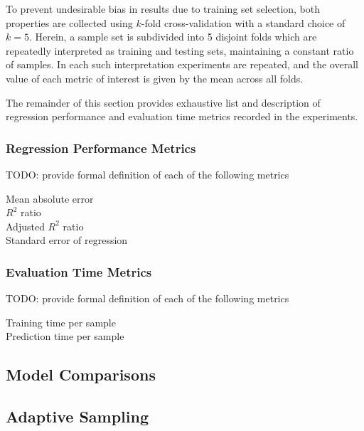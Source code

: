 To prevent undesirable bias in results due to training set selection, both
properties are collected using $k$-fold cross-validation with a standard choice
of $k=5$. Herein, a sample set is subdivided into 5 disjoint
folds which are repeatedly interpreted as training and testing sets, maintaining
a constant ratio of samples. In each such interpretation experiments are
repeated, and the overall value of each metric of interest is given by the mean
across all folds.

The remainder of this section provides exhaustive list and description of
regression performance and evaluation time metrics recorded in the experiments.

\subsubsection{Regression Performance Metrics}
\label{sec:perf-metrics}

TODO: provide formal definition of each of the following metrics

\begin{description}
	\item[Mean absolute error]
	\item[$R^2$ ratio]
	\item[Adjusted $R^2$ ratio]
	\item[Standard error of regression]
\end{description}


\subsubsection{Evaluation Time Metrics}
\label{sec:time-metrics}

TODO: provide formal definition of each of the following metrics

\begin{description}
	\item[Training time per sample]
	\item[Prediction time per sample]
\end{description}


\subsection{Model Comparisons}
\label{sec:model}


\subsection{Adaptive Sampling}
\label{sec:adaptive}

